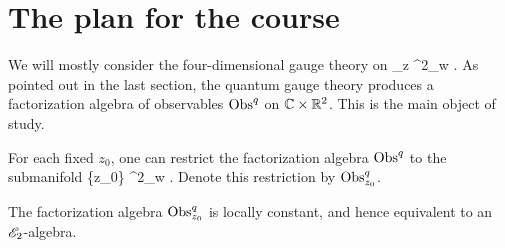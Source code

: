 \documentclass[10pt]{amsart}
\begin{document}
%
%
%
%
%


\section{The plan for the course}

We will mostly consider the four-dimensional gauge theory on
\ben
\CC_z \times \RR^2_w .
\een
As pointed out in the last section, the quantum gauge theory produces a factorization algebra of observables ${\rm Obs}^q$ on $\mathbb C \times \mathbb R^2$. 
This is the main object of study. 

For each fixed $z_0$, one can restrict the factorization algebra ${\rm Obs}^q$ to the submanifold 
\ben
\{z_0\} \times \RR^2_w .
\een 
Denote this restriction by ${\rm Obs}_{z_0}^q$. 

\begin{lem}
The factorization algebra ${\rm Obs}^q_{z_0}$ is locally constant, and hence equivalent to an $\mathscr E_2$-algebra.
\end{lem}
\end{document}
